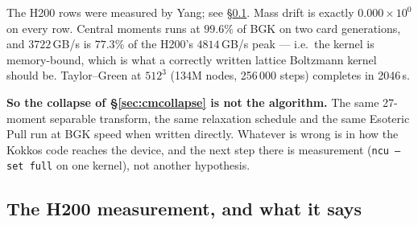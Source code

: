 \documentclass[11pt,a4paper]{article}
\newcommand{\code}[1]{\texttt{\small #1}}
\newcommand{\e}[1]{\times 10^{#1}}
\begin{document}
\noindent The H200 rows were measured by Yang; see \S\ref{sec:h200}. Mass drift
is exactly $0.000\e{0}$ on every row. Central moments runs
at $99.6\%$ of BGK on two card generations, and $3722$\,GB/s is $77.3\%$ of the
H200's $4814$\,GB/s peak --- i.e.\ the kernel is memory-bound, which is what a
correctly written lattice Boltzmann kernel should be. Taylor--Green at $512^3$
(134M nodes, 256\,000 steps) completes in 2046\,s.

\textbf{So the collapse of \S\ref{sec:cmcollapse} is not the algorithm.} The same
27-moment separable transform, the same relaxation schedule and the same Esoteric
Pull run at BGK speed when written directly. Whatever is wrong is in how the
Kokkos code reaches the device, and the next step there is measurement
(\code{ncu --set full} on one kernel), not another hypothesis.

\subsection{\texorpdfstring{\color{h200red}}{}The H200 measurement, and what it says}
\label{sec:h200}
\end{document}
